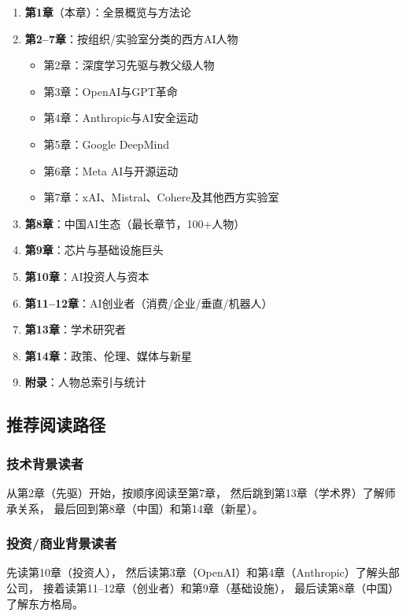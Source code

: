\begin{corebox}[章节结构]
\begin{enumerate}
  \item \textbf{第1章}（本章）：全景概览与方法论
  \item \textbf{第2--7章}：按组织/实验室分类的西方AI人物
    \begin{itemize}
      \item 第2章：深度学习先驱与教父级人物
      \item 第3章：OpenAI与GPT革命
      \item 第4章：Anthropic与AI安全运动
      \item 第5章：Google DeepMind
      \item 第6章：Meta AI与开源运动
      \item 第7章：xAI、Mistral、Cohere及其他西方实验室
    \end{itemize}
  \item \textbf{第8章}：中国AI生态（最长章节，100+人物）
  \item \textbf{第9章}：芯片与基础设施巨头
  \item \textbf{第10章}：AI投资人与资本
  \item \textbf{第11--12章}：AI创业者（消费/企业/垂直/机器人）
  \item \textbf{第13章}：学术研究者
  \item \textbf{第14章}：政策、伦理、媒体与新星
  \item \textbf{附录}：人物总索引与统计
\end{enumerate}
\end{corebox}

\subsection{推荐阅读路径}

\subsubsection{技术背景读者}
从第2章（先驱）开始，按顺序阅读至第7章，
然后跳到第13章（学术界）了解师承关系，
最后回到第8章（中国）和第14章（新星）。

\subsubsection{投资/商业背景读者}
先读第10章（投资人），
然后读第3章（OpenAI）和第4章（Anthropic）了解头部公司，
接着读第11--12章（创业者）和第9章（基础设施），
最后读第8章（中国）了解东方格局。

